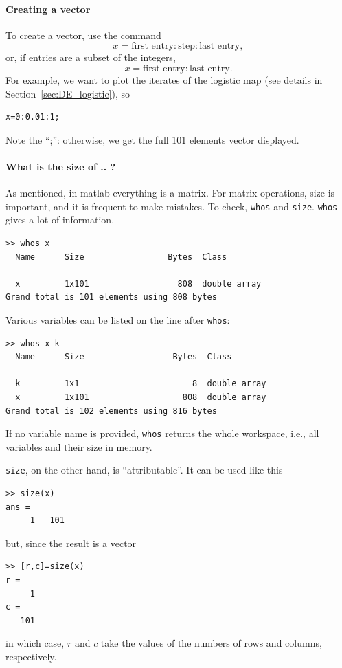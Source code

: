 
\paragraph{Creating a vector}
To create a vector, use the command
\[
x=\textrm{first entry}:\textrm{step}:\textrm{last entry},
\]
or, if entries are a subset of the integers,
\[
x=\textrm{first entry}:\textrm{last entry}.
\]
For example, we want to plot the iterates of the logistic map (see details in Section~\ref{sec:DE_logistic}), so
\begin{verbatim}
x=0:0.01:1;
\end{verbatim}
Note the ``;'': otherwise, we get the full 101 elements vector displayed.

\paragraph{What is the size of .. ?}
As mentioned, in matlab everything is a matrix. For matrix operations, size is important, and it is frequent to make mistakes. To check, {\tt whos} and {\tt size}. {\tt whos} gives a lot of information.
\begin{verbatim}
>> whos x
  Name      Size                 Bytes  Class
  
  x         1x101                  808  double array
Grand total is 101 elements using 808 bytes
\end{verbatim}
Various variables can be listed on the line after {\tt whos}:
\begin{verbatim}
>> whos x k
  Name      Size                  Bytes  Class
  
  k         1x1                       8  double array
  x         1x101                   808  double array
Grand total is 102 elements using 816 bytes
\end{verbatim}
If no variable name is provided, {\tt whos} returns the whole workspace, i.e., all variables and their size in memory.

{\tt size}, on the other hand, is ``attributable''. It can be used like this
\begin{verbatim}
>> size(x)
ans =
     1   101
\end{verbatim}
but, since the result is a vector
\begin{verbatim}
>> [r,c]=size(x)
r =
     1
c =
   101
\end{verbatim}
in which case, $r$ and $c$ take the values of the numbers of rows and columns, respectively.


